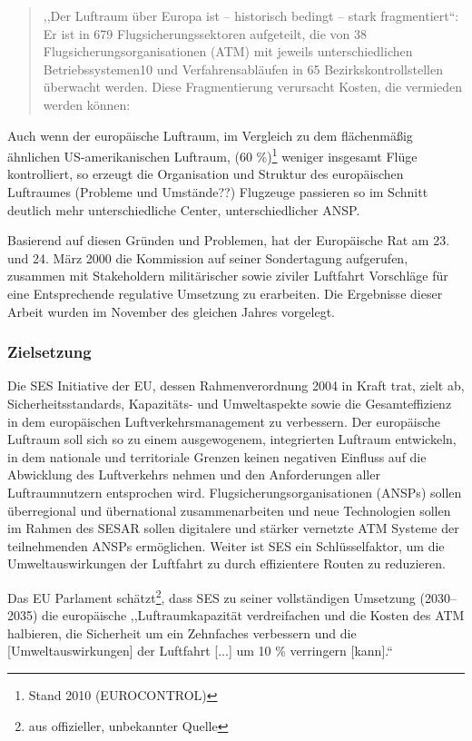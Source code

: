 
\begin{quote}
,,Der Luftraum über Europa ist – historisch bedingt – stark fragmentiert``:  Er ist in 679 Flugsicherungssektoren aufgeteilt, die von 38 Flugsicherungsorganisationen (ATM) mit jeweils unterschiedlichen
Betriebssystemen10 und Verfahrensabläufen in 65 Bezirkskontrollstellen überwacht werden. Diese Fragmentierung verursacht Kosten, die vermieden werden können:
\cite[S.6]{eu_ses_studie} 
\end{quote}

\noindent
Auch wenn der europäische Luftraum, im Vergleich zu dem flächenmäßig ähnlichen US-amerikanischen Luftraum, (60 \%)\footnote{Stand 2010 (EUROCONTROL)} weniger insgesamt Flüge kontrolliert, so erzeugt die Organisation und Struktur des europäischen Luftraumes (Probleme und Umstände??)
Flugzeuge passieren so im Schnitt deutlich mehr unterschiedliche Center, unterschiedlicher ANSP. 
\cite[S. 74]{eu_ses_fab}

Basierend auf diesen Gründen und Problemen, hat der Europäische Rat am 23. und 24. März 2000 die Kommission auf seiner Sondertagung aufgerufen, zusammen mit Stakeholdern militärischer sowie ziviler Luftfahrt Vorschläge für eine Entsprechende regulative Umsetzung zu erarbeiten.
Die Ergebnisse dieser Arbeit wurden im November des gleichen Jahres vorgelegt.
\cite[ErwG. 2]{2004R0549}

\subsubsection{Zielsetzung}

Die \acf{SES} Initiative der \acf{EU}, dessen Rahmenverordnung 2004 in Kraft trat, zielt ab, Sicherheitsstandards, Ka\-pazitäts- und Umweltaspekte sowie die Gesamteffizienz in dem europäischen Luftverkehrsmanagement zu verbessern.
Der europäische Luftraum soll sich so zu einem ausgewogenem, integrierten Luftraum entwickeln, in dem nationale und territoriale Grenzen keinen negativen Einfluss auf die Abwicklung des Luftverkehrs nehmen und den Anforderungen aller Luftraumnutzern entsprochen wird. \cite[Art. 1 Abs. 1]{2004R0549}
Flugsicherungsorganisationen (\acsp{ANSP}) sollen überregional und übernational zusammenarbeiten und neue Technologien sollen im Rahmen des \acf{SESAR} sollen digitalere und stärker vernetzte \acs{ATM} Systeme der teilnehmenden \acp{ANSP} ermöglichen.
Weiter ist \acs{SES} ein Schlüsselfaktor, um die Umweltauswirkungen der Luftfahrt zu durch effizientere Routen zu reduzieren.  

Das \acs{EU} Parlament schätzt\footnote{aus offizieller, unbekannter Quelle}, dass \ac{SES} zu seiner vollständigen Umsetzung (2030--2035) die europäische ,,Luftraumkapazität verdreifachen und die Kosten des \ac{ATM} halbieren, die Sicherheit um ein Zehnfaches verbessern und die [Umweltauswirkungen] der Luftfahrt [...] um 10 \% verringern [kann].`` 
\cite{eu_parl_ses} 


